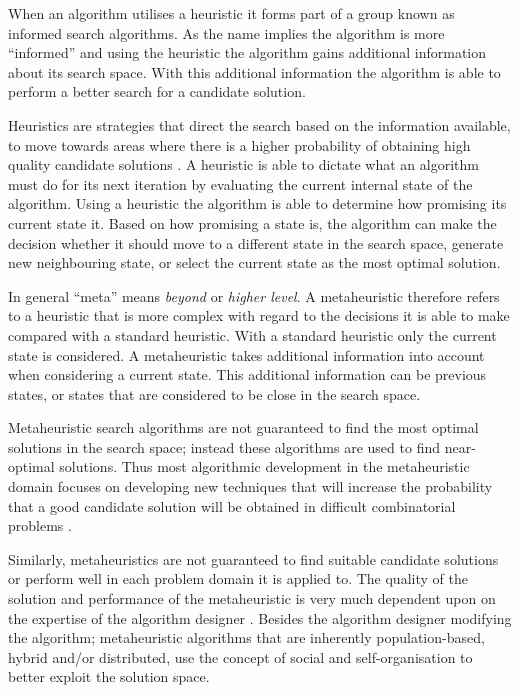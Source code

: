 When an algorithm utilises a heuristic it forms part of a group known as informed search algorithms. As the name implies the algorithm is more ``informed'' and using the heuristic the algorithm gains additional information about its search space. With this additional information the algorithm is able to perform a better search for a candidate solution\cite{AIModernApproach}.

Heuristics are strategies that direct the search based on the information available, to move towards areas where there is a higher probability of obtaining high quality candidate solutions \cite{AIModernApproach}. A heuristic is able to dictate what an algorithm must do for its next iteration by evaluating the current internal state of the algorithm. Using a heuristic the algorithm is able to determine how promising its current state it. Based on how promising a state is, the algorithm can make the decision whether it should move to a different state in the search space, generate new neighbouring state, or select the current state as the most optimal solution\cite{AIModernApproach,NatureInspiredMetaHeuristic}. 

In general ``meta'' means \emph{beyond} or \emph{higher level}\cite{AIModernApproach,NatureInspiredMetaHeuristic}. A metaheuristic therefore refers to a heuristic that is more complex with regard to the decisions it is able to make compared with a standard heuristic\cite{AIModernApproach,NatureInspiredMetaHeuristic}. With a standard heuristic only the current state is considered\cite{AIModernApproach}. A metaheuristic takes additional information into account when considering a current state\cite{NatureInspiredMetaHeuristic}. This additional information can be previous states, or states that are considered to be close in the search space\cite{AIModernApproach, NatureInspiredMetaHeuristic}.

Metaheuristic search algorithms are not guaranteed to find the most optimal solutions in the search space; instead these algorithms are used to find near-optimal solutions. Thus most algorithmic development in the metaheuristic domain focuses on developing new techniques that will increase the probability that a good candidate solution will be obtained in difficult combinatorial problems \cite{MetaAgricultural}.

Similarly, metaheuristics are not guaranteed to find suitable candidate solutions or perform well in each problem domain it is applied to. The quality of the solution and performance of the metaheuristic is very much dependent upon on the expertise of the algorithm designer \cite{AutoComplexMeta}. Besides the algorithm designer modifying the algorithm; metaheuristic algorithms that are inherently population-based, hybrid and/or distributed, use the concept of social and self-organisation to better exploit the solution space\cite{Self-AdaptiveMeta}.

